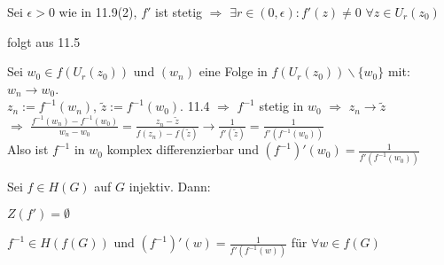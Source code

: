 \documentclass[a4paper,twoside,DIV15,BCOR12mm]{scrbook}
\begin{document}
\begin{beweis}
\begin{liste}
 \item Sei $\epsilon > 0$ wie in 11.9(2), $f'$ ist stetig $\Rightarrow$ $\exists
  r \in (0,\epsilon): f'(z) \neq 0$ $\forall z \in U_r(z_0)$
 \item folgt aus 11.5
 \item Sei $w_0 \in f(U_r(z_0))$ und $(w_n)$ eine Folge in $f(U_r(z_0)) \backslash
  \{w_0\}$ mit: $w_n \to w_0$. \\ $z_n := f^{-1}(w_n)$, $\tilde{z} := f^{-1}(w_0)$. 11.4 $\Rightarrow$
  $f^{-1}$ stetig in $w_0$ $\Rightarrow$ $z_n \to \tilde{z}$ \\
  $\Rightarrow$ $\frac{f^{-1}(w_n)-f^{-1}(w_0)}{w_n-w_0} =
  \frac{z_n-\tilde{z}}{f(z_n)-f(\tilde{z})} \to \frac{1}{f'(\tilde{z})}
  = \frac{1}{f'(f^{-1}(w_0))}$ \\
  Also ist $f^{-1}$ in $w_0$ komplex differenzierbar und $(f^{-1})'(w_0) =
  \frac{1}{f'(f^{-1}(w_0))}$ 
\end{liste}
\end{beweis}

\begin{satz}Sei $f \in H(G)$ auf $G$ injektiv. Dann: 
	\begin{liste}
		\item $Z(f') = \emptyset$
		\item $f^{-1} \in H(f(G))$ und $(f^{-1})'(w) = \frac{1}{f'(f^{-1}(w))}$ für $\forall w \in f(G)$
	\end{liste}
\end{satz}
\end{document}
